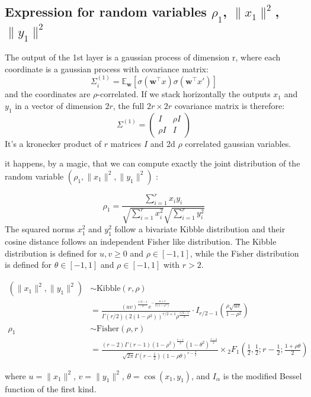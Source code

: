 \documentclass[a4paper]{article}
\begin{document}
\subsection{Expression for random variables $\rho_1$, $\|x_1\|^2$, $\|y_1\|^2$}
The output of the 1st layer is a gaussian process of dimension r, where each coordinate is a gaussian process with covariance matrix:
\[
\Sigma^{(1)}_i = \mathbb{E}_{\bm{w}} \left[ \sigma(\bm{w}^\top x) \sigma(\bm{w}^\top x') \right]
\]
and the coordinates are $\rho$-correlated. If we stack horizontally the outputs $x_1$ and $y_1$ in a vector of dimension $2r$, the full $2r \times 2r$ covariance matrix is therefore:
\[
\Sigma^{(1)} = \begin{pmatrix}
I & \rho I \\
\rho I & I
\end{pmatrix}
\]
It's a kronecker product of $r$ matrices $I$ and 2d $\rho$ correlated gaussian variables.


it happens, by a magic, that we can compute exactly the joint distribution of the random variable $(\rho_1, \|x_1\|^2, \|y_1\|^2)$ :

\[
\rho_1 = \frac{\sum_{i=1}^r x_i y_i }{\sqrt{\sum_{i=1}^r x_i^2} \sqrt{\sum_{i=1}^r y_i^2}}
\]
The squared norms $x_1^2$ and $y_1^2$ follow a bivariate Kibble distribution and their cosine distance follows an independent Fisher like distribution. The Kibble distribution is defined for $u,v \geq 0$ and $\rho \in [-1,1]$, while the Fisher distribution is defined for $\theta \in [-1,1]$ and $\rho \in [-1,1]$ with $r > 2$.

\begin{align*}
    (\|x_1\|^2, \|y_1\|^2) &\sim \text{Kibble}(r, \rho) \\
    &= \frac{(uv)^{\frac{r/2-1}{2}} e^{-\frac{u+v}{2(1-\rho^2)}}}{\Gamma(r/2) (2(1-\rho^2))^{r/2+1} \rho^{\frac{r/2-1}{2}}} \cdot I_{r/2-1}\left(\frac{\rho\sqrt{uv}}{1-\rho^2}\right) \\[1em]
    \rho_1 &\sim \text{Fisher}(\rho, r) \\
    &= \frac{(r-2)\Gamma(r-1)(1-\rho^2)^{\frac{r-1}{2}}(1-\theta^2)^{\frac{r-4}{2}}}{\sqrt{2\pi}\Gamma(r-\frac{1}{2})(1-\rho \theta)^{r-\frac{3}{2}}} \times {}_2F_1\left(\frac{1}{2}, \frac{1}{2}; r-\frac{1}{2}; \frac{1+\rho \theta}{2}\right)
\end{align*}

where $u = \|x_1\|^2$, $v = \|y_1\|^2$, $\theta = \cos(x_1,y_1)$, and $I_\alpha$ is the modified Bessel function of the first kind.
\end{document}
